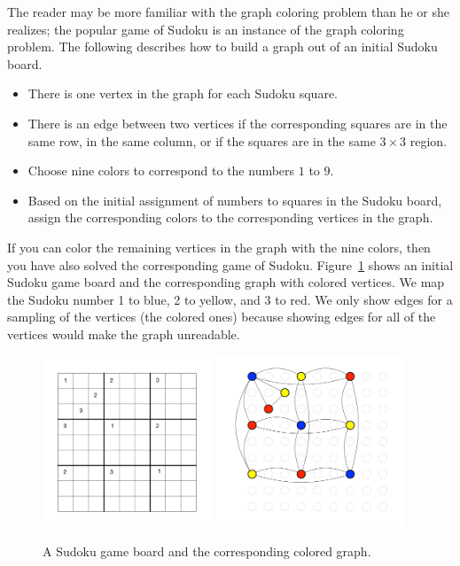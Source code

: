 \documentclass[11pt]{book}
\begin{document}
The reader may be more familiar with the graph coloring problem than he
or she realizes; the popular game of Sudoku is an instance of the
graph coloring problem. The following describes how to build a graph
out of an initial Sudoku board.
\begin{itemize}
\item There is one vertex in the graph for each Sudoku square.
\item There is an edge between two vertices if the corresponding squares
  are in the same row, in the same column, or if the squares are in
  the same $3\times 3$ region.
\item Choose nine colors to correspond to the numbers $1$ to $9$.
\item Based on the initial assignment of numbers to squares in the
  Sudoku board, assign the corresponding colors to the corresponding
  vertices in the graph.
\end{itemize}
If you can color the remaining vertices in the graph with the nine
colors, then you have also solved the corresponding game of Sudoku.
Figure~\ref{fig:sudoku-graph} shows an initial Sudoku game board and
the corresponding graph with colored vertices.  We map the Sudoku
number 1 to blue, 2 to yellow, and 3 to red.  We only show edges for a
sampling of the vertices (the colored ones) because showing edges for
all of the vertices would make the graph unreadable.

\begin{figure}[tbp]
\includegraphics[width=0.45\textwidth]{figs/sudoku}
\includegraphics[width=0.5\textwidth]{figs/sudoku-graph}
\caption{A Sudoku game board and the corresponding colored graph.}
\label{fig:sudoku-graph}
\end{figure}
\end{document}
